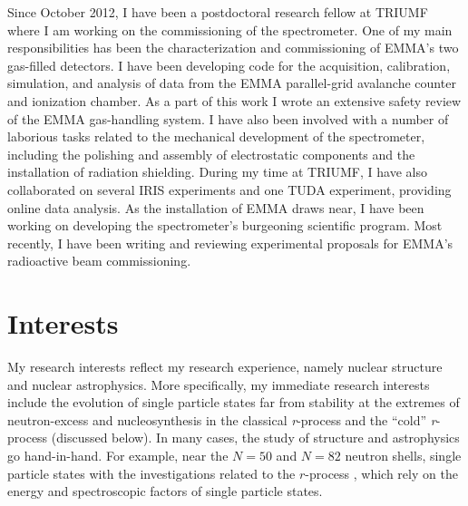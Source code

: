 {Since October 2012,
I have been a postdoctoral research fellow at TRIUMF where I am working
on the commissioning of the %
spectrometer. %
 One of my main responsibilities has been the characterization and commissioning of EMMA's two gas-filled detectors. %
 I have been developing code for the acquisition, calibration, simulation, and analysis of data from the EMMA parallel-grid avalanche counter and ionization chamber.%
As a part of this work I wrote an extensive safety review of the EMMA gas-handling system. I have also been involved with a number of laborious tasks related to the mechanical development of the spectrometer, including the polishing and assembly of  electrostatic components and the installation of radiation shielding.
		During my time at TRIUMF,  I have also collaborated on several IRIS experiments and one TUDA experiment, providing online data analysis.
		 As the installation of EMMA draws near, I have been working on developing the  spectrometer's burgeoning scientific program.	Most recently, I have been writing and reviewing %
		experimental proposals for EMMA's radioactive beam commissioning.

\section*{Interests}
My research interests reflect my research experience, namely nuclear structure and nuclear astrophysics.  More specifically, my immediate 
research interests include %
 the evolution of single particle states far from stability at the extremes of neutron-excess and nucleosynthesis in the classical \textit{r}-process and the ``cold'' \textit{r}-process (discussed below). In many cases, the study of structure
and astrophysics go hand-in-hand. For example, %
near the $N=50$ and $N=82$ neutron shells,  single particle states  with the investigations related to the $r$-process%
, which rely on the energy and spectroscopic factors of single particle states.

}
